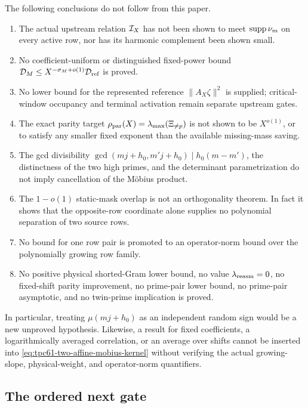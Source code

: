 The following conclusions do not follow from this paper.
\begin{enumerate}[leftmargin=2.3em]
 \item The actual upstream relation \(\mathcal I_X\) has not been shown to meet
       \(\operatorname{supp}\nu_m\) on every active row, nor has its harmonic complement
       been shown small.
 \item No coefficient-uniform or distinguished fixed-power bound
       \(\mathcal D_M\le X^{-\sigma_M+o(1)}\mathcal D_{\rm ref}\) is proved.
 \item No lower bound for the represented reference
       \(\|A_X\zeta\|^2\) is supplied; critical-window occupancy and
       terminal activation remain separate upstream gates.
 \item The exact parity target
       \(\rho_{\rm par}(X)=\lambda_{\max}(\Xi_{\ne p})\) is not shown to
       be \(X^{o(1)}\), or to satisfy any smaller fixed exponent than the
       available missing-mass saving.
 \item The gcd divisibility
       \(\gcd(mj+h_0,m'j+h_0)\mid h_0(m-m')\), the distinctness of the
       two high primes, and the determinant parametrization do not imply
       cancellation of the M\"obius product.
 \item The \(1-o(1)\) static-mask overlap is not an orthogonality theorem.
       In fact it shows that the opposite-row coordinate alone supplies
       no polynomial separation of two source rows.
 \item No bound for one row pair is promoted to an operator-norm bound
       over the polynomially growing row family.
 \item No positive physical shorted-Gram lower bound, no value
       \(\lambda_{\rm reasm}=0\), no fixed-shift parity improvement, no
       prime-pair lower bound, no prime-pair asymptotic, and no twin-prime
       implication is proved.
\end{enumerate}

In particular, treating \(\mu(mj+h_0)\) as an independent random sign
would be a new unproved hypothesis.  Likewise, a result for fixed
coefficients, a logarithmically averaged correlation, or an average over
shifts cannot be inserted into
\eqref{eq:tpc61-two-affine-mobius-kernel} without verifying the actual
growing-slope, physical-weight, and operator-norm quantifiers.

\subsection{The ordered next gate}

